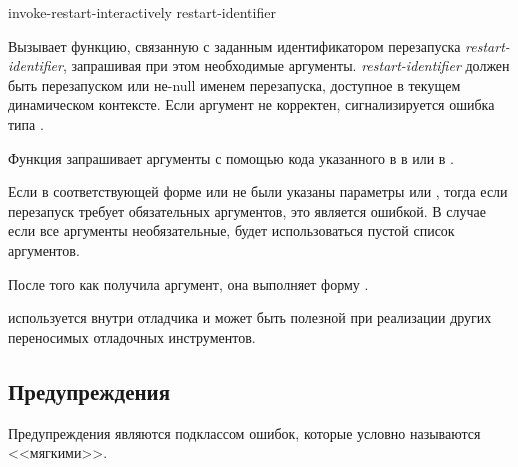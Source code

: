 \begin{defun}[Функция]
invoke-restart-interactively restart-identifier

Вызывает функцию, связанную с заданным идентификатором перезапуска
\emph{restart-identifier}, запрашивая при этом необходимые
аргументы. \emph{restart-identifier} должен быть перезапуском или не-null именем
перезапуска, доступное в текущем динамическом контексте. Если аргумент не
корректен, сигнализируется ошибка типа .

Функция  запрашивает аргументы с помощью кода
указанного в  в  или
 в .

Если в соответствующей форме  или  не были
указаны параметры  или , тогда если
перезапуск требует обязательных аргументов, это является ошибкой. В случае если
все аргументы необязательные, будет использоваться пустой список аргументов.

После того как  получила аргумент, она
выполняет форму .

 используется внутри отладчика и может быть
полезной при реализации других переносимых отладочных инструментов.
\end{defun}

\subsection{Предупреждения}
\label{WARNING-CONDITIONS}

Предупреждения являются подклассом ошибок, которые условно называются <<мягкими>>.

